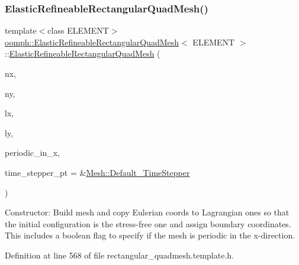 \subsubsection{\texorpdfstring{Elastic\+Refineable\+Rectangular\+Quad\+Mesh()}{ElasticRefineableRectangularQuadMesh()}\hspace{0.1cm}{\footnotesize\ttfamily [2/3]}}
{\footnotesize\ttfamily template$<$class E\+L\+E\+M\+E\+NT$>$ \\
\hyperlink{classoomph_1_1ElasticRefineableRectangularQuadMesh}{oomph\+::\+Elastic\+Refineable\+Rectangular\+Quad\+Mesh}$<$ E\+L\+E\+M\+E\+NT $>$\+::\hyperlink{classoomph_1_1ElasticRefineableRectangularQuadMesh}{Elastic\+Refineable\+Rectangular\+Quad\+Mesh} (\begin{DoxyParamCaption}\item[{const unsigned \&}]{nx,  }\item[{const unsigned \&}]{ny,  }\item[{const double \&}]{lx,  }\item[{const double \&}]{ly,  }\item[{const bool \&}]{periodic\+\_\+in\+\_\+x,  }\item[{\hyperlink{classoomph_1_1TimeStepper}{Time\+Stepper} $\ast$}]{time\+\_\+stepper\+\_\+pt = {\ttfamily \&\hyperlink{classoomph_1_1Mesh_a12243d0fee2b1fcee729ee5a4777ea10}{Mesh\+::\+Default\+\_\+\+Time\+Stepper}} }\end{DoxyParamCaption})\hspace{0.3cm}{\ttfamily [inline]}}



Constructor\+: Build mesh and copy Eulerian coords to Lagrangian ones so that the initial configuration is the stress-\/free one and assign boundary coordinates. This includes a boolean flag to specify if the mesh is periodic in the x-\/direction. 



Definition at line 568 of file rectangular\+\_\+quadmesh.\+template.\+h.

\mbox{\label{classoomph_1_1ElasticRefineableRectangularQuadMesh_a1cea0e91f2d8687182a8f5de6737a511}} 
